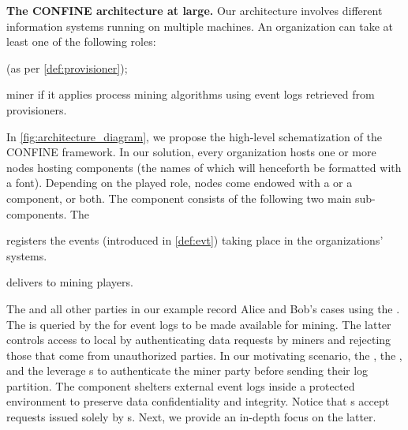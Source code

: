 \noindent\textbf{The CONFINE architecture at large.} Our architecture involves different information systems running on multiple machines. An organization can take at least one of the following roles: 
\begin{inparadesc}
\item[\NewJ{provisioner}]  (as per \cref{def:provisioner});
\item[miner] if it applies process mining algorithms using event logs retrieved from provisioners.
\end{inparadesc}
In \cref{fig:architecture_diagram}, we propose the high-level schematization of the CONFINE framework.
In our solution, every organization hosts one or more nodes hosting components (the names of which will henceforth be formatted with a  font). Depending on the played role, nodes come endowed with a  or a  component, or both. The  component consists of the following two main sub-components. The \begin{inparadesc}
\item[\Compo{Log Recorder}] registers the events (introduced in \cref{def:evt}) taking place in the organizations' systems.
\item[\Compo{Log Provider}] delivers %
 to mining players.
\end{inparadesc}
The  and all other parties in our example record Alice and Bob's cases using the . The  is queried by the  for event logs to be made available for mining. The latter controls access to local %
 by authenticating data requests by miners and rejecting those that come from unauthorized parties.
In our motivating scenario, the , the , and the  leverage s to authenticate the miner party before sending their log partition. The  component
shelters external event logs inside a protected environment to preserve data confidentiality and integrity.
Notice that s accept requests issued solely by s. 
Next, we provide an in-depth focus on the latter.

